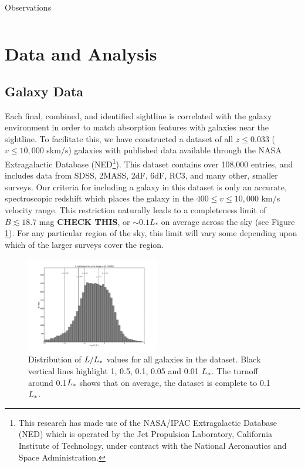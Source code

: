 \documentclass[iop]{emulateapj-rtx4}
\begin{document}
\begin{table}[ht]
\begin{center}
\begin{tabular}{l c c c c c c c c c}
\end{tabular}
\end{center}
  \caption{\small{Observations}}
  \label{target_table}
\end{table}

\section{Data and Analysis}

\subsection{Galaxy Data}
Each final, combined, and identified sightline is correlated with the galaxy environment in order to match absorption features with galaxies near the sightline. To facilitate this, we have constructed a dataset of all $z\leq 0.033$ ($v\leq 10,000$ skm/s) galaxies with published data available through the NASA Extragalactic Database (NED\footnote{This research has made use of the NASA/IPAC Extragalactic Database (NED) which is operated by the Jet Propulsion Laboratory, California Institute of Technology, under contract with the National Aeronautics and Space Administration.}). This dataset contains over 108,000 entries, and includes data from SDSS, 2MASS, 2dF, 6dF, RC3, and many other, smaller surveys. Our criteria for including a galaxy in this dataset is only an accurate, spectroscopic redshift which places the galaxy in the $400 \leq v \leq 10,000$ km/s velocity range. This restriction naturally leads to a completeness limit of $B \lesssim 18.7$ mag \textbf{CHECK THIS}, or $\sim0.1 L_*$ on average across the sky (see Figure \ref{completeness}). For any particular region of the sky, this limit will vary some depending upon which of the larger surveys cover the region. 

\begin{figure}[ht!]
        \centering
        \vspace{-10pt}
        \includegraphics[width=0.52\textwidth]{completeness_hist.pdf}
        \caption{\small{Distribution of $L/L_{\**}$ values for all galaxies in the dataset. Black vertical lines highlight 1, 0.5, 0.1, 0.05 and 0.01 $L_{\**}$. The turnoff around 0.1$L_{\**}$ shows that on average, the dataset is complete to 0.1$L_{\**}$.}}
        \label{completeness}
\end{figure} 
\end{document}

